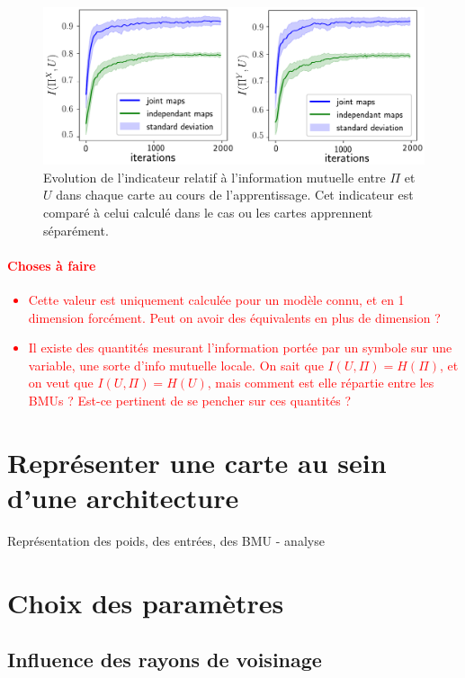 \begin{figure}
\centering
\includegraphics[width=\textwidth]{mutual_info_evol.pdf}
\caption{Evolution de l'indicateur relatif à l'information mutuelle entre $\Pi$ et $U$ dans chaque carte au cours de l'apprentissage. Cet indicateur est comparé à celui calculé dans le cas ou les cartes apprennent séparément.}
\label{fig:im} 
\end{figure}

\textcolor{red}{
\paragraph{Choses à faire}
\begin{itemize}
\item Cette valeur est uniquement calculée pour un modèle connu, et en 1 dimension forcément. Peut on avoir des équivalents en plus de dimension ? 
\item Il existe des quantités mesurant l'information portée par un symbole sur une variable, une sorte d'info mutuelle locale. On sait que $I(U,\Pi) = H(\Pi)$, et on veut que $I(U,\Pi) = H(U)$, mais comment est elle répartie entre les BMUs ? Est-ce pertinent de se pencher sur ces quantités ? 
\end{itemize}
}


\section{Représenter une carte au sein d'une architecture}

Représentation des poids, des entrées, des BMU - analyse




\section{Choix des paramètres}

\subsection{Influence des rayons de voisinage}

